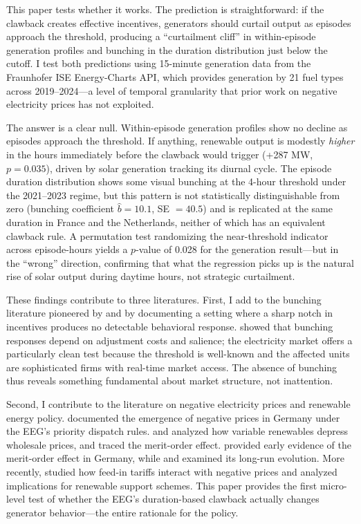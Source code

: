\documentclass[12pt]{article}
\begin{document}
This paper tests whether it works. The prediction is straightforward: if the clawback creates effective incentives, generators should curtail output as episodes approach the threshold, producing a ``curtailment cliff'' in within-episode generation profiles and bunching in the duration distribution just below the cutoff. I test both predictions using 15-minute generation data from the Fraunhofer ISE Energy-Charts API, which provides generation by 21 fuel types across 2019--2024---a level of temporal granularity that prior work on negative electricity prices has not exploited.

The answer is a clear null. Within-episode generation profiles show no decline as episodes approach the threshold. If anything, renewable output is modestly \emph{higher} in the hours immediately before the clawback would trigger (+287 MW, $p = 0.035$), driven by solar generation tracking its diurnal cycle. The episode duration distribution shows some visual bunching at the 4-hour threshold under the 2021--2023 regime, but this pattern is not statistically distinguishable from zero (bunching coefficient $\hat{b} = 10.1$, SE $= 40.5$) and is replicated at the same duration in France and the Netherlands, neither of which has an equivalent clawback rule. A permutation test randomizing the near-threshold indicator across episode-hours yields a $p$-value of 0.028 for the generation result---but in the ``wrong'' direction, confirming that what the regression picks up is the natural rise of solar output during daytime hours, not strategic curtailment.

These findings contribute to three literatures. First, I add to the bunching literature pioneered by \citet{Saez2010} and \citet{Kleven2016} by documenting a setting where a sharp notch in incentives produces no detectable behavioral response. \citet{ChettyFriedman2011} showed that bunching responses depend on adjustment costs and salience; the electricity market offers a particularly clean test because the threshold is well-known and the affected units are sophisticated firms with real-time market access. The absence of bunching thus reveals something fundamental about market structure, not inattention.

Second, I contribute to the literature on negative electricity prices and renewable energy policy. \citet{Nicolosi2010} documented the emergence of negative prices in Germany under the EEG's priority dispatch rules. \citet{Hirth2013} and \citet{Ketterer2014} analyzed how variable renewables depress wholesale prices, and \citet{Paraschiv2014} traced the merit-order effect. \citet{Sensfuss2008} provided early evidence of the merit-order effect in Germany, while \citet{Kyritsis2017} and \citet{Antweiler2021} examined its long-run evolution. More recently, \citet{deSantAnna2022} studied how feed-in tariffs interact with negative prices and \citet{Boute2020} analyzed implications for renewable support schemes. This paper provides the first micro-level test of whether the EEG's duration-based clawback actually changes generator behavior---the entire rationale for the policy.
\end{document}
